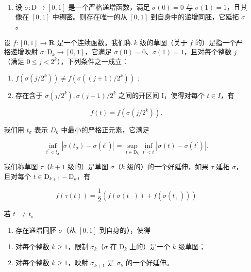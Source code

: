 \begin{enumerate}
\def\labelenumi{\alph{enumi})}
\tightlist
\item
  设 \(\sigma\colon\mathrm{D}\to[0,1]\) 是一个严格递增函数，满足 \(\sigma(0)=0\) 与 \(\sigma(1)=1\)，且其像在 \([0,1]\) 中稠密。则存在唯一的从 \([0,1]\) 到自身中的递增同胚，它延拓 \(\sigma\)。
\end{enumerate}

设 \(f\colon [0,1]\to \mathbf{R}\) 是一个连续函数。我们称 \(k\) 级的草图（关于 \(f\) 的）是指一个严格递增映射 \(\sigma \colon \mathrm{D}_k\to [0,1]\)，它满足 \(\sigma (0) = 0\)、\(\sigma (1) = 1\)，且对每个整数 \(j\)（满足 \(0\leqslant j < 2^k\)），下列条件之一成立：

\begin{enumerate}
\def\labelenumi{(\roman{enumi})}
\item
  \(f(\sigma(j/2^{k})) \neq f(\sigma((j+1)/2^{k}))\) ;
\item
  存在含于 \(\sigma(j/2^{k}), \sigma(j+1)/2^{k}\) 之间的开区间 I，使得对每个 \(t \in I\)，有
\end{enumerate}

\[
f (t) = f (\sigma (j / 2 ^ {k})).
\]

我们用 \(t_{\sigma}\) 表示 \(D_{k}\) 中最小的严格正元素，它满足

\[
\inf _ {t ^ {\prime} <   t _ {\sigma}} | \sigma (t _ {\sigma}) - \sigma (t ^ {\prime}) | = \sup _ {t \in \mathrm{D} _ {k}} \inf _ {t ^ {\prime} <   t} | \sigma (t) - \sigma (t ^ {\prime}) |.
\]

我们称草图 \(\tau\)（\(k + 1\) 级的）是草图 \(\sigma\)（\(k\) 级的）的一个好延伸，如果 \(\tau\) 延拓 \(\sigma\)，且对每个 \(t \in \mathrm{D}_{k+1} - \mathrm{D}_k\)，有

\[
f (\tau (t)) = \frac {1}{2} (f (\sigma (t _ {-})) + f (\sigma (t _ {+})))
\]

若 \(t_{-}\neq t_{\sigma}\)

\begin{enumerate}
\def\labelenumi{\alph{enumi})}
\setcounter{enumi}{1}
\tightlist
\item
  存在递增同胚 \(\sigma\)（从 \([0,1]\) 到自身的），使得
\end{enumerate}

\begin{enumerate}
\def\labelenumi{(\roman{enumi})}
\item
  对每个整数 \(k \geqslant 1\)，限制 \(\sigma_{k}\)（\(\sigma\) 在 \(\mathrm{D}_{k}\) 上的）是一个 \(k\) 级草图；
\item
  对每个整数 \(k \geqslant 1\)，映射 \(\sigma_{k+1}\) 是 \(\sigma_{k}\) 的一个好延伸。
\end{enumerate}

